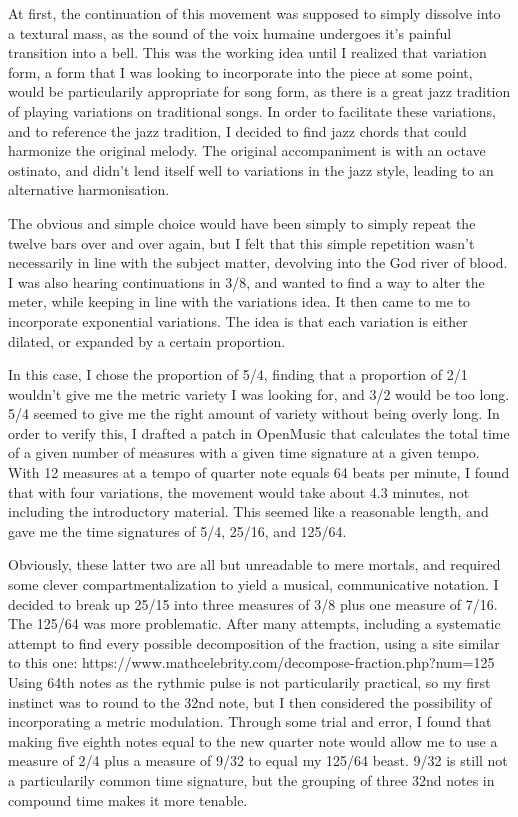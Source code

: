 \documentclass[12pt,twoside,maitrise]{dms_ks}
\theoremstyle{definition}
\begin{document}
At first, the continuation of this movement was supposed to simply dissolve into a textural mass, as the sound of the voix humaine undergoes it's painful transition into a bell.
This was the working idea until I realized that variation form, a form that I was looking to incorporate into the piece at some point, would be particularily appropriate for song form, as there is a great jazz tradition of playing variations on traditional songs.
In order to facilitate these variations, and to reference the jazz tradition, I decided to find jazz chords that could harmonize the original melody.
The original accompaniment is with an octave ostinato, and didn't lend itself well to variations in the jazz style, leading to an alternative harmonisation.


The obvious and simple choice would have been simply to simply repeat the twelve bars over and over again, but I felt that this simple repetition wasn't necessarily in line with the subject matter, devolving into the God river of blood.
I was also hearing continuations in 3/8, and wanted to find a way to alter the meter, while keeping in line with the variations idea.
It then came to me to incorporate exponential variations.
The idea is that each variation is either dilated, or expanded by a certain proportion.

In this case, I chose the proportion of 5/4, finding that a proportion of 2/1 wouldn't give me the metric variety I was looking for, and 3/2 would be too long.
5/4 seemed to give me the right amount of variety without being overly long.
In order to verify this, I drafted a patch in OpenMusic that calculates the total time of a given number of measures with a given time signature at a given tempo.
With 12 measures at a tempo of quarter note equals 64 beats per minute, I found that with four variations, the movement would take about 4.3 minutes, not including the introductory material.
This seemed like a reasonable length, and gave me the time signatures of 5/4, 25/16, and 125/64.

Obviously, these latter two are all but unreadable to mere mortals, and required some clever compartmentalization to yield a musical, communicative notation.
I decided to break up 25/15 into three measures of 3/8 plus one measure of 7/16.
The 125/64 was more problematic.
After many attempts, including a systematic attempt to find every possible decomposition of the fraction, using a site similar to this one: https://www.mathcelebrity.com/decompose-fraction.php?num=125%
Using 64th notes as the rythmic pulse is not particularily practical, so my first instinct was to round to the 32nd note, but I then considered the possibility of incorporating a metric modulation.
Through some trial and error, I found that making five eighth notes equal to the new quarter note would allow me to use a measure of 2/4 plus a measure of 9/32 to equal my 125/64 beast.
9/32 is still not a particularily common time signature, but the grouping of three 32nd notes in compound time makes it more tenable.
\end{document}
